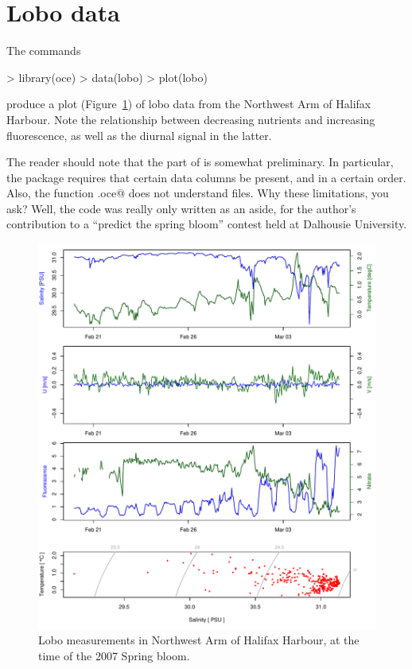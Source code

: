 \documentclass{article}
\begin{document}
\goodbreak


\section{Lobo data}
The commands
\begin{Schunk}
\begin{Sinput}
> library(oce)
> data(lobo)
> plot(lobo)
\end{Sinput}
\end{Schunk}
produce a plot (Figure~\ref{fig:lobo}) of lobo data from the Northwest Arm of
Halifax Harbour.  Note the relationship between decreasing nutrients and
increasing fluorescence, as well as the diurnal signal in the latter.

The reader should note that the \verb@lobo@ part of \verb@oce@ is somewhat
preliminary. In particular, the package requires that certain data columns be
present, and in a certain order. Also, the function \verb@read.oce@ does not
understand \verb@lobo@ files. Why these limitations, you ask? Well, the
\verb@lobo@ code was really only written as an aside, for the author's
contribution to a ``predict the spring bloom'' contest held at Dalhousie
University.

\begin{figure}
\begin{center}
\includegraphics{oce-lobofig}
\end{center}
\caption{Lobo measurements in Northwest Arm of Halifax Harbour, at
the time of the 2007 Spring bloom.}
\label{fig:lobo}
\end{figure}
\end{document}
